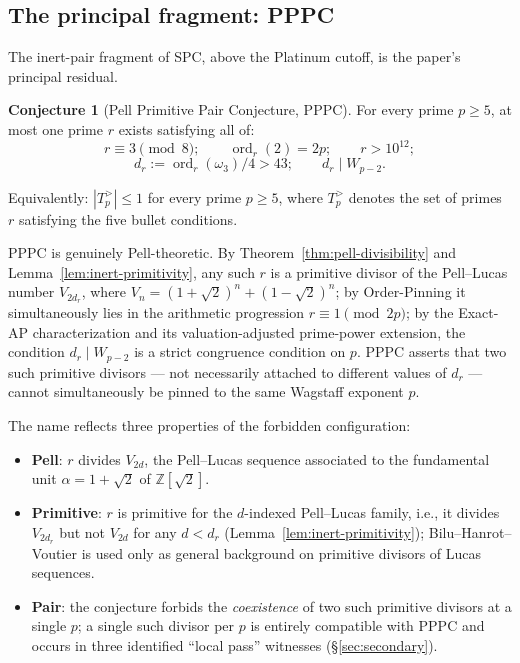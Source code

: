 \documentclass[11pt]{amsart}
\theoremstyle{plain}
\theoremstyle{definition}
\newtheorem{conjecture}[theorem]{Conjecture}
\theoremstyle{remark}
\numberwithin{equation}{section}
\newcommand{\ord}{\operatorname{ord}}
\newcommand{\Z}{\mathbb{Z}}
\begin{document}
\subsection{The principal fragment: PPPC}\label{sec:pppc-statement}

The inert-pair fragment of SPC, above the Platinum cutoff, is the paper's principal residual.

\begin{conjecture}[Pell Primitive Pair Conjecture, PPPC]\label{conj:pppc-intro}
For every prime $p \geq 5$, at most one prime $r$ exists satisfying all of:
\[
  r \equiv 3 \pmod 8; \qquad \ord_r(2) = 2 p; \qquad r > 10^{12};
\]
\[
  d_r := \ord_r(\omega_3)/4 > 43; \qquad d_r \mid W_{p-2}.
\]
\end{conjecture}

Equivalently: $|T_p^{>}| \leq 1$ for every prime $p \geq 5$, where $T_p^{>}$ denotes the set of primes $r$ satisfying the five bullet conditions.

PPPC is genuinely Pell-theoretic. By Theorem~\ref{thm:pell-divisibility} and Lemma~\ref{lem:inert-primitivity}, any such $r$ is a primitive divisor of the Pell--Lucas number $V_{2 d_r}$, where $V_n = (1+\sqrt 2)^n + (1-\sqrt 2)^n$; by Order-Pinning it simultaneously lies in the arithmetic progression $r \equiv 1 \pmod{2p}$; by the Exact-AP characterization and its valuation-adjusted prime-power extension, the condition $d_r \mid W_{p-2}$ is a strict congruence condition on $p$. PPPC asserts that two such primitive divisors --- not necessarily attached to different values of $d_r$ --- cannot simultaneously be pinned to the same Wagstaff exponent $p$.

The name reflects three properties of the forbidden configuration:

\begin{itemize}
\item \textbf{Pell}: $r$ divides $V_{2 d}$, the Pell--Lucas sequence associated to the fundamental unit $\alpha = 1 + \sqrt 2$ of $\Z[\sqrt 2]$.
\item \textbf{Primitive}: $r$ is primitive for the $d$-indexed Pell--Lucas family, i.e., it divides $V_{2 d_r}$ but not $V_{2 d}$ for any $d < d_r$ (Lemma~\ref{lem:inert-primitivity}); Bilu--Hanrot--Voutier \cite{ref:BHV} is used only as general background on primitive divisors of Lucas sequences.
\item \textbf{Pair}: the conjecture forbids the \emph{coexistence} of two such primitive divisors at a single $p$; a single such divisor per $p$ is entirely compatible with PPPC and occurs in three identified ``local pass'' witnesses (\S\ref{sec:secondary}).
\end{itemize}
\end{document}
